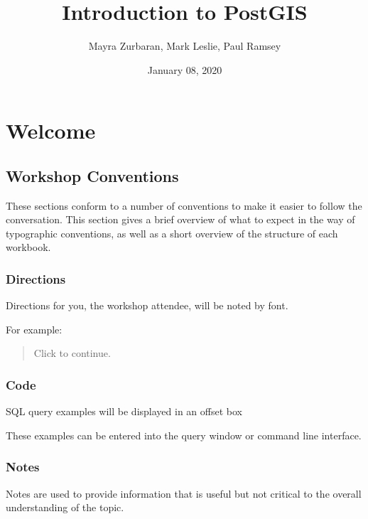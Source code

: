 \documentclass[a4paper,11pt,english]{sphinxmanual}
\title{Introduction to PostGIS}
\date{January 08, 2020}
\author{Mayra Zurbaran, Mark Leslie, Paul Ramsey}
\begin{document}
\pagestyle{empty}
\sphinxmaketitle
\pagestyle{plain}
\sphinxtableofcontents
\pagestyle{normal}
\label{\detokenize{index::doc}}



\chapter{Welcome}
\label{\detokenize{welcome:welcome}}\label{\detokenize{welcome:id1}}\label{\detokenize{welcome::doc}}

\section{Workshop Conventions}
\label{\detokenize{welcome:workshop-conventions}}
These sections conform to a number of conventions to make it easier to follow the conversation. This section gives a brief overview of what to expect in the way of typographic conventions, as well as a short overview of the structure of each workbook.


\subsection{Directions}
\label{\detokenize{welcome:directions}}
Directions for you, the workshop attendee, will be noted by  font.

For example:
\begin{quote}

Click  to continue.
\end{quote}


\subsection{Code}
\label{\detokenize{welcome:code}}
SQL query examples will be displayed in an offset box

\begin{sphinxVerbatim}[commandchars=\\\{\}]
 
\end{sphinxVerbatim}

These examples can be entered into the query window or command line interface.


\subsection{Notes}
\label{\detokenize{welcome:notes}}
Notes are used to provide information that is useful but not critical to the overall understanding of the topic.
\end{document}

